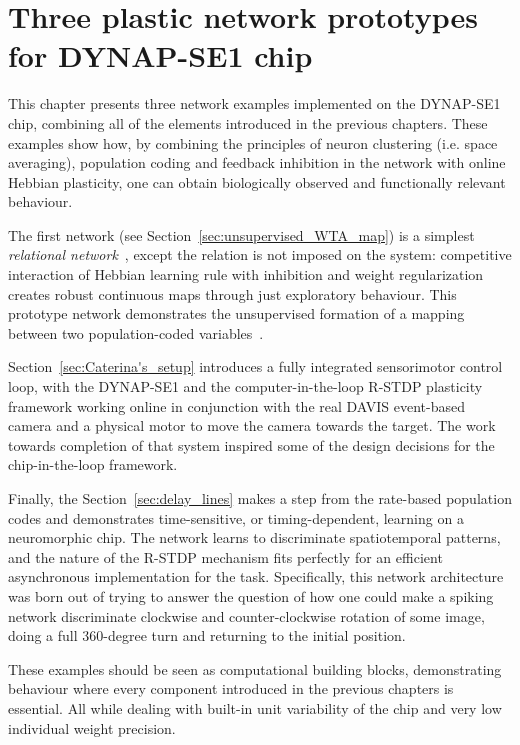 \chapter{Three plastic network prototypes for DYNAP-SE1 chip}
\label{ch:EXAMPLES}

 This chapter presents three network examples implemented on the DYNAP-SE1 chip, combining all of the elements introduced in the previous chapters.
 These examples show how, by combining the principles of neuron clustering (i.e. space averaging), population coding and feedback inhibition in the network with online Hebbian plasticity, one can obtain biologically observed and functionally relevant behaviour.

The first network (see Section~\ref{sec:unsupervised_WTA_map}) is a simplest \emph{relational network}~\cite{Diehl_Cook16}, except the relation is not imposed on the system: competitive interaction of Hebbian learning rule with inhibition and weight regularization creates robust continuous maps through just exploratory behaviour. This prototype network demonstrates the unsupervised formation of a mapping between two population-coded variables~\cite{Song_Abbott01}.

Section~\ref{sec:Caterina's_setup} introduces a fully integrated sensorimotor control loop, with the DYNAP-SE1 and the computer-in-the-loop R-STDP plasticity framework working online in conjunction with the real DAVIS event-based camera and a physical motor to move the camera towards the target. The work towards completion of that system inspired some of the design decisions for the chip-in-the-loop framework.

Finally, the Section~\ref{sec:delay_lines} makes a step from the rate-based population codes and demonstrates time-sensitive, or timing-dependent, learning on a neuromorphic chip. The network learns to discriminate spatiotemporal patterns, and the nature of the R-STDP mechanism fits perfectly for an efficient asynchronous implementation for the task. Specifically, this network architecture was born out of trying to answer the question of how one could make a spiking network discriminate clockwise and counter-clockwise rotation of some image, doing a full 360-degree turn and returning to the initial position. 

These examples should be seen as computational building blocks, demonstrating behaviour where every component introduced in the previous chapters is essential. All while dealing with built-in unit variability of the chip and very low individual weight precision.


